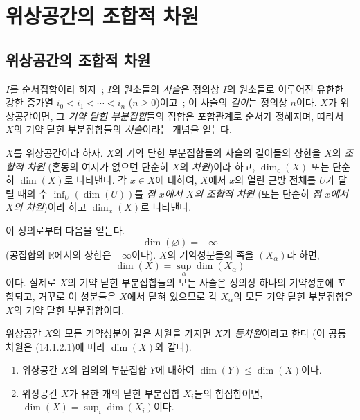 \section{위상공간의 조합적 차원}
\label{section:0.14-fr}

\setcounter{subsection}{0}
\subsection{위상공간의 조합적 차원}
\label{subsection:0.14.1-fr}

\begin{env}[14.1.1]
\label{0.14.1.1-fr}
$I$를 순서집합이라 하자~; $I$의 원소들의 \emph{사슬}은 정의상
$I$의 원소들로 이루어진 유한한 강한 증가열
$i_0<i_1<\cdots<i_n$ ($n\geq 0$)이고~; 이 사슬의 \emph{길이}는
정의상 $n$이다. $X$가 위상공간이면, 그 \emph{기약 닫힌 부분집합}들의
집합은 포함관계로 순서가 정해지며, 따라서 $X$의 기약 닫힌
부분집합들의 \emph{사슬}이라는 개념을 얻는다.
\end{env}

\begin{definition}[14.1.2]
\label{0.14.1.2-fr}
$X$를 위상공간이라 하자. $X$의 기약 닫힌 부분집합들의 사슬의 길이들의
상한을 $X$의 \emph{조합적 차원} (혼동의 여지가 없으면 단순히 $X$의
\emph{차원})이라 하고, $\dim_c(X)$ 또는 단순히 $\dim(X)$로 나타낸다.
각 $x\in X$에 대하여, $X$에서 $x$의 열린 근방 전체를 $U$가 달릴 때의
수 $\inf_U(\dim(U))$를 \emph{점 $x$에서 $X$의 조합적 차원} (또는
단순히 \emph{점 $x$에서 $X$의 차원})이라 하고 $\dim_x(X)$로 나타낸다.
\end{definition}

이 정의로부터 다음을 얻는다.
\[
  \dim(\varnothing)=-\infty
\]
(공집합의 $\overline{\mathbb R}$에서의 상한은 $-\infty$이다). $X$의
기약성분들의 족을 $(X_\alpha)$라 하면,
\[
  \dim(X)=\sup_\alpha\dim(X_\alpha)
  \tag{14.1.2.1}\label{0.14.1.2.1-fr}
\]
이다. 실제로 $X$의 기약 닫힌 부분집합들의 모든 사슬은 정의상 하나의
기약성분에 포함되고, 거꾸로 이 성분들은 $X$에서 닫혀 있으므로 각
$X_\alpha$의 모든 기약 닫힌 부분집합은 $X$의 기약 닫힌 부분집합이다.

\begin{definition}[14.1.3]
\label{0.14.1.3-fr}
위상공간 $X$의 모든 기약성분이 같은 차원을 가지면 $X$가
\emph{등차원}이라고 한다 (이 공통 차원은 (14.1.2.1)에 따라
$\dim(X)$와 같다).
\end{definition}

\begin{proposition}[14.1.4]
\label{0.14.1.4-fr}
\begin{enumerate}
  \item[\rm(i)] 위상공간 $X$의 임의의 부분집합 $Y$에 대하여
  $\dim(Y)\leq\dim(X)$이다.
  \item[\rm(ii)] 위상공간 $X$가 유한 개의 닫힌 부분집합 $X_i$들의
  합집합이면, $\dim(X)=\sup_i\dim(X_i)$이다.
\end{enumerate}
\end{proposition}

